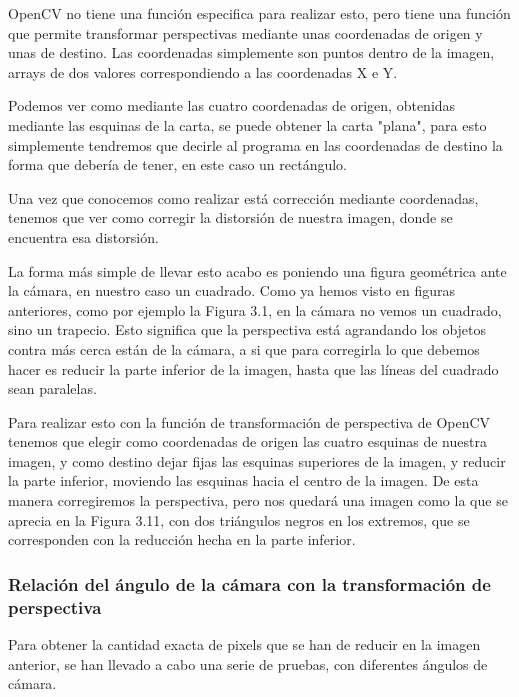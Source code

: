 OpenCV no tiene una función especifica para realizar esto, pero tiene una función que permite transformar perspectivas mediante unas coordenadas de origen y unas de destino\cite{persp_trans}. Las coordenadas simplemente son puntos dentro de la imagen, arrays de dos valores correspondiendo a las coordenadas X e Y.


Podemos ver como mediante las cuatro coordenadas de origen, obtenidas mediante las esquinas de la carta, se puede obtener la carta "plana", para esto simplemente tendremos que decirle al programa en las coordenadas de destino la forma que debería de tener, en este caso un rectángulo.

Una vez que conocemos como realizar está corrección mediante coordenadas, tenemos que ver como corregir la distorsión de nuestra imagen, donde se encuentra esa distorsión.

La forma más simple de llevar esto acabo es poniendo una figura geométrica ante la cámara, en nuestro caso un cuadrado. Como ya hemos visto en figuras anteriores, como por ejemplo la Figura 3.1, en la cámara no vemos un cuadrado, sino un trapecio. Esto significa que la perspectiva está agrandando los objetos contra más cerca están de la cámara, a si que para corregirla lo que debemos hacer es reducir la parte inferior de la imagen, hasta que las líneas del cuadrado sean paralelas.

Para realizar esto con la función de transformación de perspectiva de OpenCV tenemos que elegir como coordenadas de origen las cuatro esquinas de nuestra imagen, y como destino dejar fijas las esquinas superiores de la imagen, y reducir la parte inferior, moviendo las esquinas hacia el centro de la imagen\cite{coord_persp}. De esta manera corregiremos la perspectiva, pero nos quedará una imagen como la que se aprecia en la Figura 3.11, con dos triángulos negros en los extremos, que se corresponden con la reducción hecha en la parte inferior. 

\subsubsection{Relación del ángulo de la cámara con la transformación de perspectiva}

Para obtener la cantidad exacta de pixels que se han de reducir en la imagen anterior, se han llevado a cabo una serie de pruebas, con diferentes ángulos de cámara.

